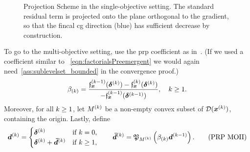 \documentclass{article}
\theoremstyle{plain}
\theoremstyle{definition}
\begin{document}
\begin{figure}[h!]
    \centering
	\caption{
		Projection Scheme in the single-objective setting. The standard residual term is 
		projected onto the plane orthogonal to the gradient, so that the fincal \ac{cg}
		direction (blue) has sufficient decrease by construction.%
	}
\end{figure}

To go to the multi-objective setting, use the \ac{prp} coefficient
as in~\cite{lucambioperezNonlinearConjugateGradient2018}.
(If we used a coefficient similar to ~\eqref{eqn:factorialsPreemergent}
we would again need~\cref{ass:sublevelset_bounded} in the convergence proof.)
\begin{equation}
	\beta_{(k)} = 
\frac{\mathfrak{f}_{\bm{x}}^{(k-1)}(\bm{\delta}^{(k)}) - \mathfrak{f}_{\bm{x}}^{(k)}(\bm{\delta}^{(k)})}{-\mathfrak{f}_{\bm{x}}^{(k-1)}(\bm{\delta}^{(k-1)})},
\quad
k\geq 1.
\label{eqn:tarnishesBandeaux}
\end{equation}
Moreover, for all $k \geq 1$, let $M^{(k)}$ be a non-empty convex
subset of $\mathcal D(\bm{x}^{(k)})$, containing the origin.
Lastly, define
\begin{equation}
	\bm{d}^{(k)} = 
	\begin{cases}
		\bm{\delta}^{(k)}
		&\text{if $k = 0$,}
		\\
		\bm{\delta}^{(k)} + \bm{\bar{d}}^{(k)}
		&\text{if $k \geq 1$},
	\end{cases}
	\qquad
	\bm{\bar{d}}^{(k)} 
	= 
	\mathfrak P_{M^{(k)}}\left(\beta_{(k)} \bm{d}^{(k-1)}\right)
	.
	\tag{PRP~MOII}
	\label{eqn:prpMOProj}
\end{equation}
\end{document}
